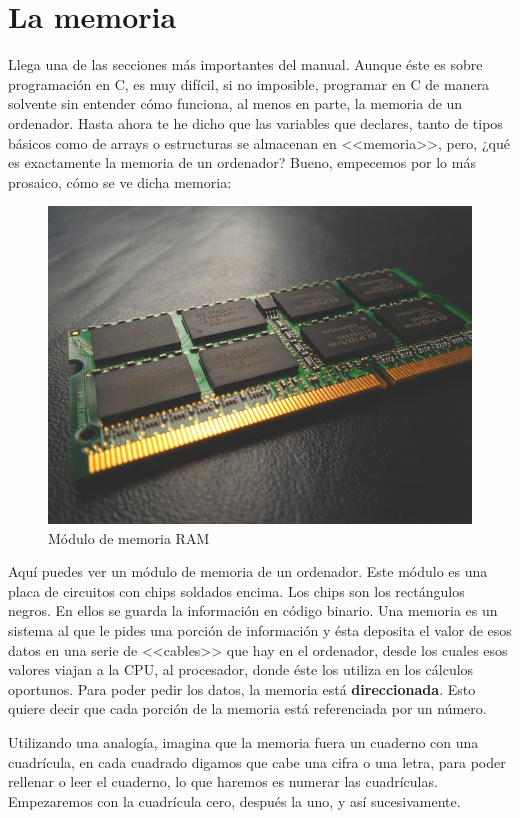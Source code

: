 \documentclass[a4paper]{article}
\begin{document}
\section{La memoria}
Llega una de las secciones más importantes del manual. Aunque éste es sobre
programación en C, es muy difícil, si no imposible, programar en C de manera
solvente sin entender cómo funciona, al menos en parte, la memoria de un
ordenador. Hasta ahora te he dicho que las variables que declares, tanto
de tipos básicos como de arrays o estructuras se almacenan en <<memoria>>,
pero, ¿qué es exactamente la memoria de un ordenador? Bueno, empecemos por
lo más prosaico, cómo se ve dicha memoria:
\begin{figure}[H]
\includegraphics[width=\linewidth]{ram}
\caption{Módulo de memoria RAM}
\label{img:ram}
\end{figure}

Aquí puedes ver un módulo de memoria de un ordenador. Este módulo es una placa
de circuitos con chips soldados encima. Los chips son los rectángulos negros.
En ellos se guarda la información en código binario. Una memoria es un sistema
al que le pides una porción de información y ésta deposita el valor de esos
datos en una serie de <<cables>> que hay en el ordenador, desde los cuales
esos valores viajan a la CPU, al procesador, donde éste los  utiliza en los
cálculos oportunos. Para poder pedir los datos, la memoria está
\textbf{direccionada}. Esto quiere decir que cada porción de la memoria está
referenciada por un número.

Utilizando una analogía, imagina que la memoria
fuera un cuaderno con una cuadrícula, en cada cuadrado digamos que cabe una
cifra o una letra, para poder rellenar o leer el cuaderno, lo que haremos
es numerar las cuadrículas. Empezaremos con la cuadrícula cero, después la uno,
y así sucesivamente.
\end{document}
